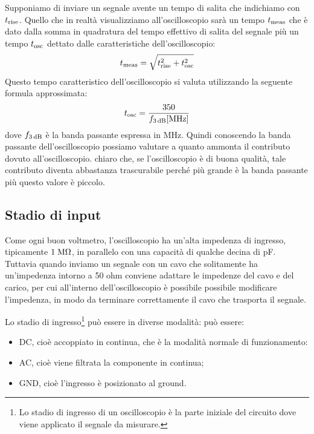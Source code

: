 Supponiamo di inviare un segnale avente un tempo di salita che indichiamo con $t_{\rm rise}$. Quello che in realtà visualizziamo all'oscilloscopio sarà un tempo $t_{\rm meas}$ che è dato dalla somma in quadratura del tempo effettivo di salita del segnale più un tempo $t_{\rm osc}$ dettato dalle caratteristiche dell'oscilloscopio:
\begin{equation*}
   t_{\rm meas}=\sqrt{ t_{\rm rise}^2 + t_{\rm osc}^2 }
\end{equation*}
Questo tempo caratteristico dell'oscilloscopio si valuta utilizzando la seguente formula approssimata:
\begin{equation*}
   t_{\rm osc}=\frac{350}{f_{\rm 3 \, dB}[\rm MHz]}
\end{equation*}
dove $f_{\rm 3 \, dB}$ è la banda passante espressa in MHz. Quindi conoscendo la banda passante dell'oscilloscopio possiamo valutare a quanto ammonta il contributo dovuto all'oscilloscopio. \E chiaro che, se l'oscilloscopio è di buona qualità, tale contributo diventa abbastanza trascurabile perché più grande è la banda passante più questo valore è piccolo.

\subsection{Stadio di input}

Come ogni buon voltmetro, l'oscilloscopio ha un'alta impedenza di ingresso, tipicamente $1 \rm \; M\Omega$, in parallelo con una capacità di qualche decina di pF. Tuttavia quando inviamo un segnale con un cavo che solitamente ha un'impedenza intorno a 50 ohm conviene adattare le impedenze del cavo e del carico, per cui all'interno dell'oscilloscopio è possibile possibile modificare l'impedenza, in modo da terminare correttamente il cavo che trasporta il segnale.

Lo stadio di ingresso\footnote{Lo stadio di ingresso di un oscilloscopio è la parte iniziale del circuito dove viene applicato il segnale da misurare.} può essere in diverse modalità: può essere:
\begin{itemize}[leftmargin=0.5cm]
   \item DC, cioè accoppiato in continua, che è la modalità normale di funzionamento:
   \item AC, cioè viene filtrata la componente in continua;
   \item GND, cioè l'ingresso è posizionato al ground.
\end{itemize}

